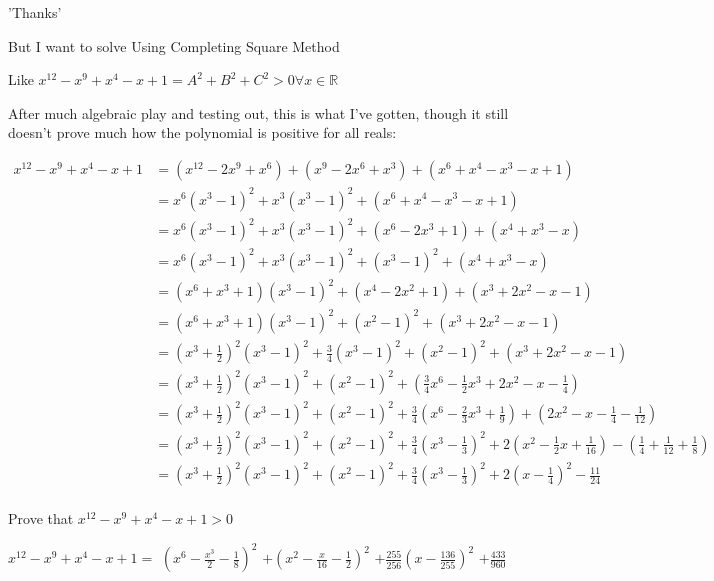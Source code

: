 \begin{solution}
	\begin{bolded}'Thanks' \end{bolded}

But I want to solve Using Completing Square Method

Like $x^{12}-x^9+x^4-x+1 = A^2+B^2+C^2>0\forall x\in \mathbb{R}$
\end{solution}



\begin{solution}
	After much algebraic play and testing out, this is what I've gotten, though it still doesn't prove much how the polynomial is positive for all reals:

$\begin{aligned}x^{12}-x^9+x^4-x+1
&=(x^{12}-2x^9+x^6)+(x^9-2x^6+x^3)+(x^6+x^4-x^3-x+1)\\
&=x^6(x^3-1)^2+x^3(x^3-1)^2+(x^6+x^4-x^3-x+1)\\
&=x^6(x^3-1)^2+x^3(x^3-1)^2+(x^6-2x^3+1)+(x^4+x^3-x)\\
&=x^6(x^3-1)^2+x^3(x^3-1)^2+(x^3-1)^2+(x^4+x^3-x)\\
&=(x^6+x^3+1)(x^3-1)^2+(x^4-2x^2+1)+(x^3+2x^2-x-1)\\
&=(x^6+x^3+1)(x^3-1)^2+(x^2-1)^2+(x^3+2x^2-x-1)\\
&=\left(x^3+\frac12\right)^2(x^3-1)^2+\frac34(x^3-1)^2+(x^2-1)^2+(x^3+2x^2-x-1)\\
&=\left(x^3+\frac12\right)^2(x^3-1)^2+(x^2-1)^2+\left(\frac34x^6-\frac12x^3+2x^2-x-\frac14\right)\\
&=\left(x^3+\frac12\right)^2(x^3-1)^2+(x^2-1)^2+\frac34\left(x^6-\frac23x^3+\frac19\right)+\left(2x^2-x-\frac14-\frac1{12}\right)\\
&=\left(x^3+\frac12\right)^2(x^3-1)^2+(x^2-1)^2+\frac34\left(x^3-\frac13\right)^2+2\left(x^2-\frac12x+\frac1{16}\right)-\left(\frac14+\frac1{12}+\frac18\right)\\
&=\left(x^3+\frac12\right)^2(x^3-1)^2+(x^2-1)^2+\frac34\left(x^3-\frac13\right)^2+2\left(x-\frac14\right)^2-\frac{11}{24}\\
\end{aligned}$
\end{solution}



\begin{solution}
	\begin{tcolorbox}Prove that $x^{12}-x^{9}+x^4-x+1 > 0$\end{tcolorbox}
$x^{12}-x^9+x^4-x+1=$ $\left(x^6-\frac{x^3}2-\frac 18\right)^2$ $+\left(x^2-\frac x{16}-\frac 12\right)^2$ $+\frac{255}{256}\left(x-\frac{136}{255}\right)^2$ $+\frac{433}{960}$
\end{solution}



